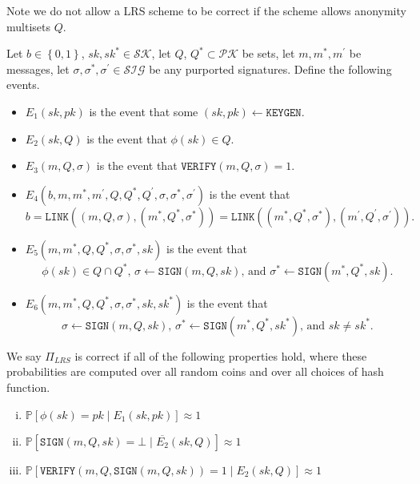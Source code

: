 \documentclass{llncs}
\begin{document}
Note we do not allow a LRS scheme to be correct if the scheme allows anonymity multisets $Q$.

\begin{definition}\label{def:lrs-correct}
Let $b\in \left\{0,1\right\}$, $sk, sk^* \in \mathcal{SK}$, let $Q$, $Q^* \subset \mathcal{PK}$ be sets, let $m, m^*, m^\prime$ be messages, let $\sigma, \sigma^*, \sigma^\prime \in \mathcal{SIG}$ be any purported signatures. Define the following events.
\begin{itemize}
\item $E_1(sk, pk)$ is the event that some $(sk, pk) \leftarrow \texttt{KEYGEN}$.

\item $E_2(sk, Q)$ is the event that $\phi(sk) \in Q$.

\item $E_3(m, Q, \sigma)$ is the event that $\texttt{VERIFY}(m, Q, \sigma) = 1$.

\item $E_4(b, m, m^*, m^\prime, Q, Q^*, Q^\prime, \sigma, \sigma^*, \sigma^\prime)$ is the event that \[b = \texttt{LINK}((m, Q, \sigma), (m^*, Q^*, \sigma^*)) = \texttt{LINK}((m^*, Q^*, \sigma^*), (m^\prime, Q^\prime, \sigma^\prime)).\]

\item $E_5(m, m^*, Q, Q^*, \sigma, \sigma^*, sk)$ is the event that \[\phi(sk) \in Q \cap Q^*\text{, }\sigma \leftarrow \texttt{SIGN}(m, Q, sk)\text{, and }\sigma^* \leftarrow \texttt{SIGN}(m^*, Q^*, sk).\]

\item $E_6(m, m^*, Q, Q^*, \sigma, \sigma^*, sk, sk^*)$ is the event that  \[\sigma \leftarrow \texttt{SIGN}(m, Q, sk)\text{, }\sigma^* \leftarrow \texttt{SIGN}(m^*, Q^*, sk^*)\text{, and }sk \neq sk^*.\]
\end{itemize}
We say $\Pi_{LRS}$ is correct if all of the following properties hold, where these probabilities are computed over all random coins and over all choices of hash function.

\begin{enumerate}[(i)]
\item $\mathbb{P}\left[ \phi(sk) = pk \mid E_1(sk, pk) \right] \approx 1$

\item $\mathbb{P}\left[ \texttt{SIGN}(m, Q, sk) = \bot \mid \overline{E_2}(sk, Q)  \right] \approx 1$

\item $\mathbb{P}\left[ \texttt{VERIFY}(m, Q, \texttt{SIGN}(m, Q, sk)) = 1 \mid E_2(sk, Q) \right] \approx 1$


\end{enumerate}
\end{definition}
\end{document}
